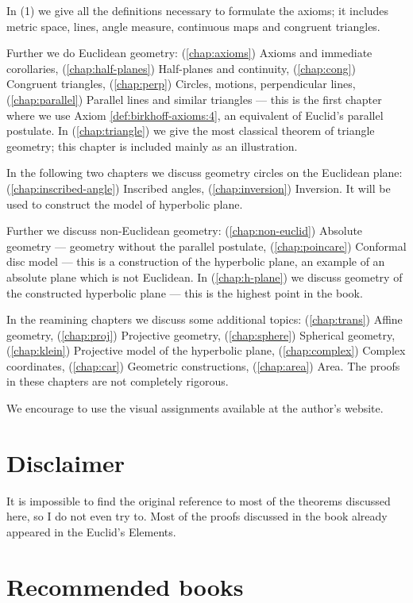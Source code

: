 \smallskip

In (1) we give all the definitions necessary to formulate the axioms;
it includes metric space, 
lines, 
angle measure, 
continuous maps and congruent triangles.

Further we do Euclidean geometry:
(\ref{chap:axioms}) Axioms and immediate corollaries,
(\ref{chap:half-planes}) Half-planes and continuity,
(\ref{chap:cong}) Congruent triangles,
(\ref{chap:perp}) Circles, motions, perpendicular lines,
(\ref{chap:parallel}) Parallel lines and similar triangles
--- this is the first chapter where we use Axiom \ref{def:birkhoff-axioms:4}, an equivalent of Euclid's parallel postulate.
In (\ref{chap:triangle}) we give the most classical theorem of triangle geometry;
this chapter is included mainly as an illustration.


In the following two chapters we discuss geometry circles on the Euclidean plane:
(\ref{chap:inscribed-angle}) Inscribed angles, (\ref{chap:inversion}) Inversion.
It  will be used to construct the model of hyperbolic plane.

Further 
we discuss non-Euclidean geometry:
(\ref{chap:non-euclid})
Absolute geometry --- geometry without the parallel postulate,
(\ref{chap:poincare})
Conformal disc model ---
this is a construction of the hyperbolic plane,
an example of an absolute plane which is not Euclidean.
In (\ref{chap:h-plane}) we discuss geometry of the constructed hyperbolic plane --- this is the highest point in the book.

In the reamining chapters we discuss some additional topics:
(\ref{chap:trans}) Affine geometry,
(\ref{chap:proj}) Projective geometry,
(\ref{chap:sphere}) Spherical geometry, 
(\ref{chap:klein}) Projective model of the hyperbolic plane,
(\ref{chap:complex}) Complex coordinates,
(\ref{chap:car}) Geometric constructions,
(\ref{chap:area}) Area.
The proofs in these chapters are not completely rigorous.

We encourage to use the visual assignments available at the author's website.

\section*{Disclaimer}

It is  impossible to find the original reference to most of the theorems discussed here, so I do not even try to.
Most of the proofs discussed in the book 
already appeared in the Euclid's Elements.

\section*{Recommended books}

